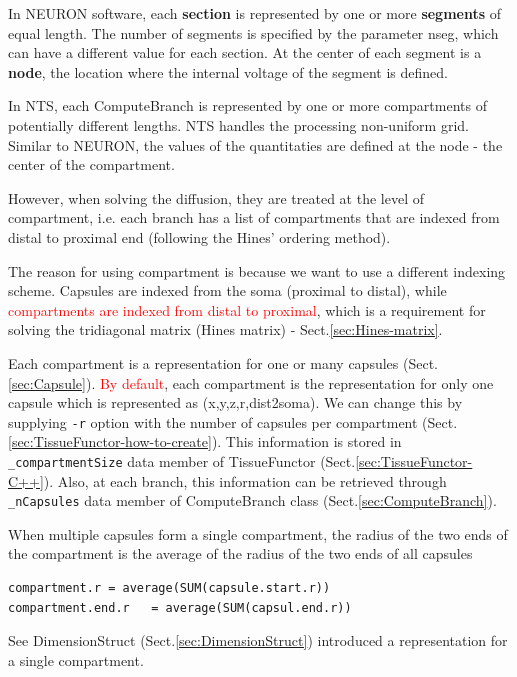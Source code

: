 \begin{mdframed}

In NEURON software,  each {\bf section} is represented by one or more {\bf
segments} of equal length. The number of segments is specified by the parameter
nseg, which can have a different value for each section. At the center of each
segment is a {\bf node}, the location where the internal voltage of the segment
is defined.

In NTS, each ComputeBranch is represented by one or more compartments of
potentially different lengths. NTS handles the processing non-uniform grid.
Similar to NEURON, the values of the quantitaties are defined at the node - the
center of the compartment.
\end{mdframed}

However, when solving the diffusion, they are treated at the level of
compartment, i.e. each branch has a list of compartments that are indexed from
distal to proximal end (following the Hines' ordering method).


The reason for using compartment is because we want to use a different indexing
scheme. Capsules are indexed from the soma (proximal to distal), while
\textcolor{red}{compartments are indexed from distal to proximal}, which is a
requirement for solving the tridiagonal matrix (Hines matrix) -
Sect.\ref{sec:Hines-matrix}.

Each compartment is a representation for one or many capsules
(Sect.\ref{sec:Capsule}).
\textcolor{red}{By default}, each compartment is the representation for only one
capsule which is represented as (x,y,z,r,dist2soma). We can change this by
supplying \verb!-r! option with the number of capsules per compartment (Sect.\ref{sec:TissueFunctor-how-to-create}). This
information is stored in \verb!_compartmentSize! data member of TissueFunctor
(Sect.\ref{sec:TissueFunctor-C++}). Also, at each branch, this information can
be retrieved through \verb!_nCapsules! data member of ComputeBranch class
(Sect.\ref{sec:ComputeBranch}).

When multiple capsules form a single compartment, the radius of the
two ends of the compartment is the average of the radius of the two ends of all
capsules
\begin{verbatim}
compartment.r = average(SUM(capsule.start.r))
compartment.end.r   = average(SUM(capsul.end.r))
\end{verbatim}

See DimensionStruct (Sect.\ref{sec:DimensionStruct}) introduced a representation
for a single compartment.

